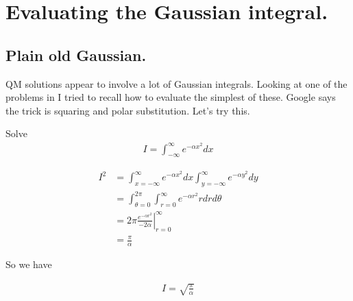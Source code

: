 
%
%



\chapter{Evaluating the Gaussian integral. }

%

\section{Plain old Gaussian. }

QM solutions appear to involve a lot of Gaussian integrals.  Looking at one
of the problems in \cite{mcmahon2005qmd} I tried to recall how to evaluate
the simplest of these.  Google says the trick is squaring and polar 
substitution.  Let's try this.

Solve
\begin{align*}
I = \int_{-\infty}^\infty e^{-\alpha x^2} dx
\end{align*}

\begin{align*}
I^2 
&= \int_{x= -\infty}^\infty e^{-\alpha x^2} dx \int_{y = -\infty}^\infty e^{-\alpha y^2} dy \\
&= \int_{\theta=0}^{2\pi}\int_{r= 0}^\infty e^{-\alpha r^2} r dr d\theta \\
&= 2\pi 
{\left.
\frac{e^{-\alpha r^2}}{-2\alpha}
\right\vert}_{r= 0}^\infty  \\
&= \frac{\pi}{\alpha}
\end{align*}

So we have

\begin{align*}
I = \sqrt{\frac{\pi}{\alpha}}
\end{align*}

